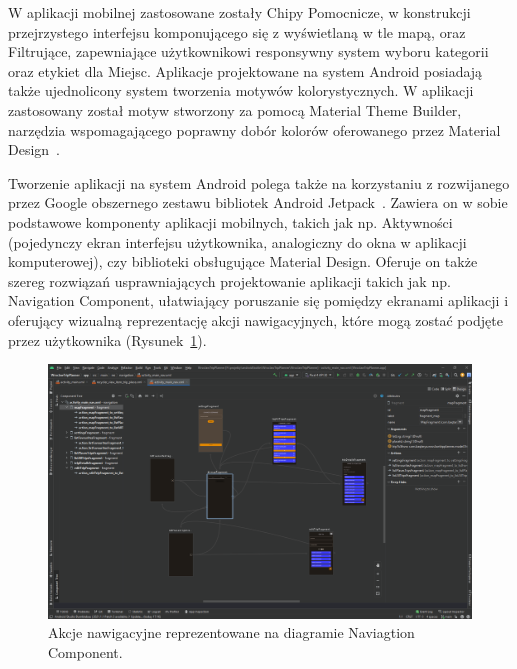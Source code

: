     
    W aplikacji mobilnej zastosowane zostały Chipy Pomocnicze, w konstrukcji przejrzystego
    interfejsu komponującego się z wyświetlaną w tle mapą, oraz Filtrujące, zapewniające użytkownikowi responsywny system wyboru kategorii oraz etykiet dla Miejsc. Aplikacje projektowane na system Android 
    posiadają także ujednolicony system tworzenia motywów kolorystycznych. W aplikacji zastosowany został motyw stworzony za pomocą Material Theme Builder, narzędzia wspomagającego poprawny dobór 
    kolorów oferowanego przez Material Design~\cite{THEME}.

    Tworzenie aplikacji na system Android polega także na korzystaniu z rozwijanego przez Google obszernego zestawu bibliotek Android Jetpack~\cite{JETPACK}. Zawiera on w sobie podstawowe 
    komponenty aplikacji mobilnych, takich jak np. Aktywności (pojedynczy ekran interfejsu użytkownika, analogiczny do okna w aplikacji komputerowej), czy biblioteki obsługujące Material Design. Oferuje 
    on także szereg rozwiązań usprawniających projektowanie aplikacji takich jak np. Navigation Component, ułatwiający poruszanie się pomiędzy ekranami aplikacji i oferujący wizualną reprezentację akcji 
    nawigacyjnych, które mogą zostać podjęte przez użytkownika (Rysunek~\ref{jetpack}).

    \begin{figure}[!ht]%
        \centering
        \includegraphics[scale=0.35]{src/jetpack_nav.png}
        \caption{Akcje nawigacyjne reprezentowane na diagramie Naviagtion Component.\label{jetpack}}
        \qquad
    \end{figure} 

